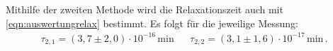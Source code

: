   \noindent
  Mithilfe der zweiten Methode wird die Relaxationszeit auch mit \eqref{eqn:auswertungrelax} bestimmt.
  Es folgt für die jeweilige Messung:
  \begin{align*}
    \tau_{2,1} =  (3,7\pm 2,0)\cdot 10^{-16}\,\si{\minute} &&  \tau_{2,2} = (3,1\pm 1,6)\cdot 10^{-17}\,\si{\minute}\, . \\ %
  \end{align*}
